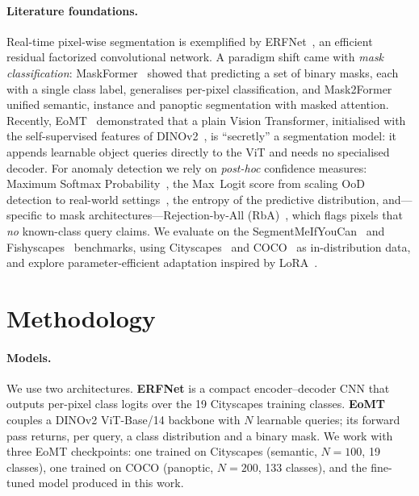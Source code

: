 \documentclass[10pt,twocolumn]{article}
\begin{document}
\paragraph{Literature foundations.}
Real-time pixel-wise segmentation is exemplified by
ERFNet~\cite{romera2018erfnet}, an efficient residual factorized
convolutional network. A paradigm shift came with \emph{mask
classification}: MaskFormer~\cite{cheng2021maskformer} showed that predicting a
set of binary masks, each with a single class label, generalises per-pixel
classification, and Mask2Former~\cite{cheng2022mask2former} unified semantic,
instance and panoptic segmentation with masked attention. Recently,
EoMT~\cite{kerssies2025eomt} demonstrated that a plain Vision Transformer,
initialised with the self-supervised features of
DINOv2~\cite{oquab2023dinov2}, is ``secretly'' a segmentation model: it appends
learnable object queries directly to the ViT and needs no specialised decoder.
For anomaly detection we rely on \emph{post-hoc} confidence measures: Maximum
Softmax Probability~\cite{hendrycks2017msp}, the Max~Logit score from scaling
OoD detection to real-world settings~\cite{hendrycks2022scaling}, the entropy
of the predictive distribution, and---specific to mask
architectures---Rejection-by-All (RbA)~\cite{nayal2023rba}, which flags pixels
that \emph{no} known-class query claims. We evaluate on the
SegmentMeIfYouCan~\cite{chan2021smiyc} and Fishyscapes~\cite{blum2021fishyscapes}
benchmarks, using Cityscapes~\cite{cordts2016cityscapes} and
COCO~\cite{lin2014coco} as in-distribution data, and explore parameter-efficient
adaptation inspired by LoRA~\cite{hu2022lora}.

\section{Methodology}

\paragraph{Models.}
We use two architectures. \textbf{ERFNet} is a compact encoder--decoder CNN
that outputs per-pixel class logits over the 19 Cityscapes training classes.
\textbf{EoMT} couples a DINOv2 ViT-Base/14 backbone with $N$ learnable queries;
its forward pass returns, per query, a class distribution and a binary mask. We
work with three EoMT checkpoints: one trained on Cityscapes (semantic, $N{=}100$,
19 classes), one trained on COCO (panoptic, $N{=}200$, 133 classes), and the
fine-tuned model produced in this work.
\end{document}
